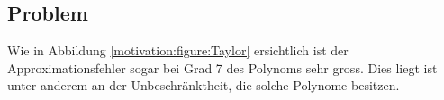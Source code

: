 \subsection{Problem}
Wie in Abbildung \ref{motivation:figure:Taylor} ersichtlich ist der Approximationsfehler sogar bei Grad 7 des Polynoms sehr gross. Dies liegt ist unter anderem an der Unbeschränktheit, die solche Polynome besitzen. 

